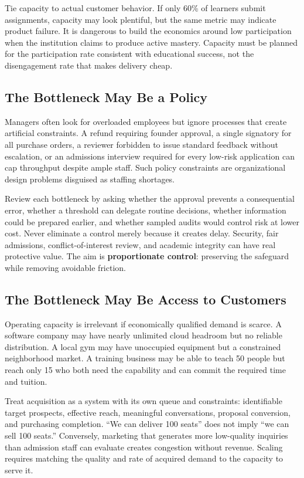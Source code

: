 Tie capacity to actual customer behavior. If only 60\% of learners submit assignments, capacity may look plentiful, but the same metric may indicate product failure. It is dangerous to build the economics around low participation when the institution claims to produce active mastery. Capacity must be planned for the participation rate consistent with educational success, not the disengagement rate that makes delivery cheap.

\subsection{The Bottleneck May Be a Policy}
\label{sec:bottleneck_may_be_policy}

Managers often look for overloaded employees but ignore processes that create artificial constraints. A refund requiring founder approval, a single signatory for all purchase orders, a reviewer forbidden to issue standard feedback without escalation, or an admissions interview required for every low-risk application can cap throughput despite ample staff. Such policy constraints are organizational design problems disguised as staffing shortages.

Review each bottleneck by asking whether the approval prevents a consequential error, whether a threshold can delegate routine decisions, whether information could be prepared earlier, and whether sampled audits would control risk at lower cost. Never eliminate a control merely because it creates delay. Security, fair admissions, conflict-of-interest review, and academic integrity can have real protective value. The aim is \textbf{proportionate control}: preserving the safeguard while removing avoidable friction.

\subsection{The Bottleneck May Be Access to Customers}
\label{sec:bottleneck_access_to_customers}

Operating capacity is irrelevant if economically qualified demand is scarce. A software company may have nearly unlimited cloud headroom but no reliable distribution. A local gym may have unoccupied equipment but a constrained neighborhood market. A training business may be able to teach 50 people but reach only 15 who both need the capability and can commit the required time and tuition.

Treat acquisition as a system with its own queue and constraints: identifiable target prospects, effective reach, meaningful conversations, proposal conversion, and purchasing completion. ``We can deliver 100 seats'' does not imply ``we can sell 100 seats.'' Conversely, marketing that generates more low-quality inquiries than admission staff can evaluate creates congestion without revenue. Scaling requires matching the quality and rate of acquired demand to the capacity to serve it.

